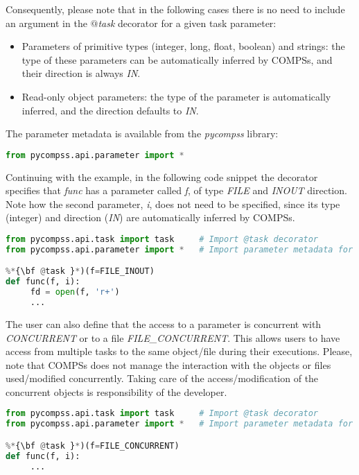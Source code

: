Consequently, please note that in the following cases there is no need to include an argument in 
the {\it $@$task} decorator for a given task parameter:

\begin{itemize}
 \item Parameters of primitive types (integer, long, float, boolean) and strings: the type of these 
       parameters can be automatically inferred by COMPSs, and their direction is always {\it IN}.
 \item Read-only object parameters: the type of the parameter is automatically inferred, and the 
       direction defaults to {\it IN}.
\end{itemize}

The parameter metadata is available from the {\it pycompss} library:

\begin{lstlisting}[language=python]
from pycompss.api.parameter import *
\end{lstlisting}
 
Continuing with the example, in the following code snippet the decorator specifies that {\it func} 
has a parameter called {\it f}, of type {\it FILE} and {\it INOUT} direction. Note how the second 
parameter, {\it i}, does not need to be specified, since its type (integer) and direction ({\it IN}) 
are automatically inferred by COMPSs.

\begin{lstlisting}[language=python]
from pycompss.api.task import task     # Import @task decorator
from pycompss.api.parameter import *   # Import parameter metadata for the @task decorator

%*{\bf @task }*)(f=FILE_INOUT)
def func(f, i):
     fd = open(f, 'r+')
     ...
\end{lstlisting}

The user can also define that the access to a parameter is concurrent with {\it CONCURRENT} or to a file {\it FILE\_CONCURRENT}.
This allows users to have access from multiple tasks to the same object/file during their executions.
Please, note that COMPSs does not manage the interaction with the objects or files used/modified concurrently.
Taking care of the access/modification of the concurrent objects is responsibility of the developer.

\begin{lstlisting}[language=python]
from pycompss.api.task import task     # Import @task decorator
from pycompss.api.parameter import *   # Import parameter metadata for the @task decorator

%*{\bf @task }*)(f=FILE_CONCURRENT)
def func(f, i):
     ...
\end{lstlisting}

